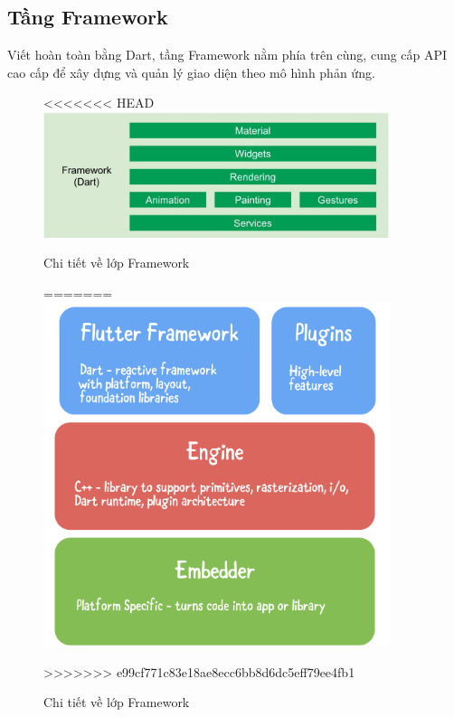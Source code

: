 \documentclass[../DoAn.tex]{subfiles}
\numberwithin{figure}{chapter}
\begin{document}
\subsection{Tầng Framework}
 Viết hoàn toàn bằng Dart, tầng Framework nằm phía trên cùng, cung cấp API cao cấp để xây dựng và quản lý giao diện theo mô hình phản ứng.
 \begin{figure}[H]
    \centering
<<<<<<< HEAD
    \includegraphics[width=0.9\textwidth]{Hinhve/Chuong5/tang_framework.jpg}
    \caption{Chi tiết về lớp Framework}
    \label{fig:frameworklayer}
=======
    \includegraphics[width=0.9\textwidth]{Hinhve/Chuong5/flutterFramework.png}
    \caption{Chi tiết về lớp Framework}
    \label{fig:flutterframework}
>>>>>>> e99cf771c83e18ae8ecc6bb8d6dc5eff79ee4fb1
\end{figure}
\end{document}
